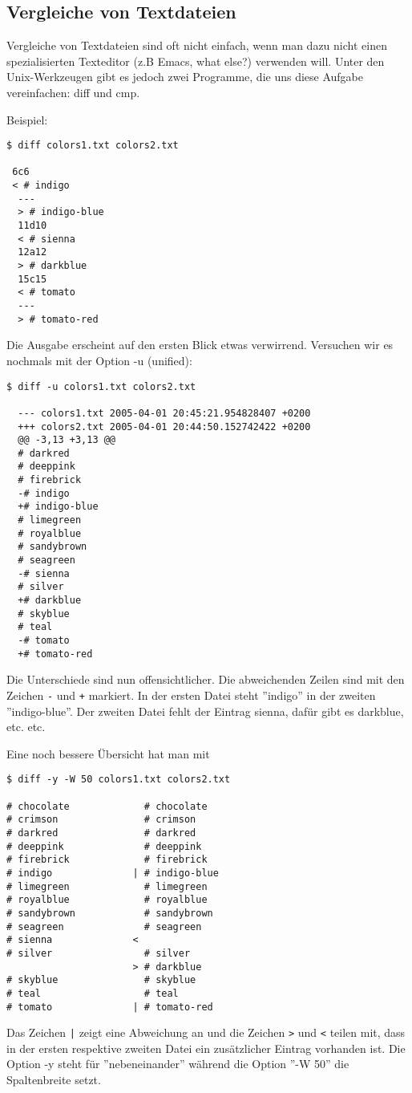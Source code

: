 \subsection{Vergleiche von Textdateien}
Vergleiche von Textdateien sind oft nicht einfach, wenn man dazu
nicht einen spezialisierten Texteditor (z.B Emacs, what else?) verwenden will.
Unter den Unix-Werkzeugen gibt es jedoch zwei Programme, die
uns diese Aufgabe vereinfachen: diff und cmp.

\newslide
Beispiel:
\begin{lstlisting}[basicstyle=\small]
$ diff colors1.txt colors2.txt

 6c6
 < # indigo
  ---
  > # indigo-blue
  11d10
  < # sienna
  12a12
  > # darkblue
  15c15
  < # tomato
  ---
  > # tomato-red
\end{lstlisting}
\newslide
Die Ausgabe erscheint auf den ersten Blick etwas verwirrend.
Versuchen wir es nochmals mit der Option -u (unified):
\begin{lstlisting}
$ diff -u colors1.txt colors2.txt

  --- colors1.txt 2005-04-01 20:45:21.954828407 +0200
  +++ colors2.txt 2005-04-01 20:44:50.152742422 +0200
  @@ -3,13 +3,13 @@
  # darkred
  # deeppink
  # firebrick
  -# indigo
  +# indigo-blue
  # limegreen
  # royalblue
  # sandybrown
  # seagreen
  -# sienna
  # silver
  +# darkblue
  # skyblue
  # teal
  -# tomato
  +# tomato-red
\end{lstlisting}
Die Unterschiede sind nun offensichtlicher. Die abweichenden
Zeilen sind mit den Zeichen \verb+-+ und \verb|+| markiert.
In der ersten Datei steht ''indigo''
in der zweiten ''indigo-blue''. Der zweiten Datei fehlt der Eintrag
sienna, dafür gibt es darkblue, etc. etc.

\newslide
Eine noch bessere Übersicht hat man mit
\begin{lstlisting}
$ diff -y -W 50 colors1.txt colors2.txt

# chocolate             # chocolate
# crimson               # crimson
# darkred               # darkred
# deeppink              # deeppink
# firebrick             # firebrick
# indigo              | # indigo-blue
# limegreen             # limegreen
# royalblue             # royalblue
# sandybrown            # sandybrown
# seagreen              # seagreen
# sienna              <
# silver                # silver
                      > # darkblue
# skyblue               # skyblue
# teal                  # teal
# tomato              | # tomato-red
\end{lstlisting}
Das Zeichen \verb+|+ zeigt eine Abweichung an und die Zeichen
\verb+>+ und  \verb+<+ teilen mit, dass in der ersten
respektive zweiten Datei ein zusätzlicher
Eintrag vorhanden ist.
Die Option -y
steht für ''nebeneinander'' während die Option ''-W 50''
die Spaltenbreite setzt.


